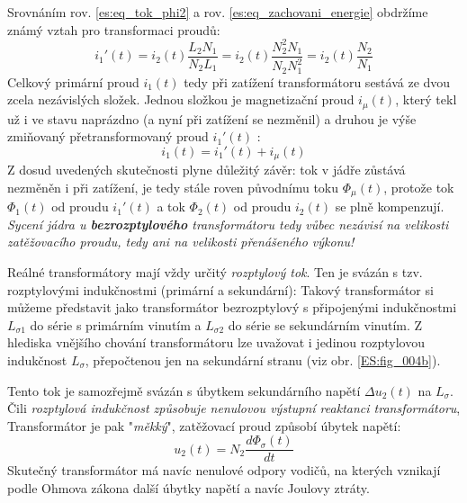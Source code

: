 {      Srovnáním rov. \ref{es:eq_tok_phi2} a rov. \ref{es:eq_zachovani_energie} obdržíme známý vztah
      pro transformaci proudů:
      \begin{equation}\label{es:eq_i1_cark}
        i_1'(t)=i_2(t)\frac{L_2N_1}{N_2L_1}=i_2 (t)\frac{N_2^2N_1}{N_2N_1^2}=i_2(t)\frac{N_2}{N_1}
      \end{equation}
      Celkový primární proud $i_1(t)$ tedy při zatížení transformátoru sestává ze dvou zcela 
      nezávislých složek. Jednou složkou je magnetizační proud $i_\mu(t)$, který tekl už i ve stavu 
      naprázdno (a nyní při zatížení se nezměnil) a druhou je výše zmiňovaný přetransformovaný 
      proud $i_1'(t)$ :
      \begin{equation}\label{es:eq_i1_sum}
        i_1(t)=i_1'(t)+i_\mu(t)
      \end{equation}
      Z dosud uvedených skutečnosti plyne důležitý závěr: tok v jádře zůstává nezměněn i při 
      zatížení, je tedy stále roven původnímu toku $\Phi_\mu(t)$, protože tok $\Phi_1(t)$ od proudu 
      $i_1'(t)$ a tok $\Phi_2(t)$ od proudu $i_2(t)$ se plně kompenzují. \emph{Sycení jádra u 
      \textbf{bezrozptylového} transformátoru tedy vůbec nezávisí na velikosti zatěžovacího 
      prou\-du, tedy ani na velikosti přenášeného výkonu!}

      Reálné transformátory mají vždy určitý \emph{rozptylový tok}. Ten je svázán s tzv.      
      roz\-pty\-lo\-vý\-mi indukčnostmi (primární a sekundární): Takový transformátor si můžeme 
      představit jako transformátor bezrozptylový s připojen\-ými indukčnostmi $L_{\sigma1}$ do 
      série s pri\-már\-ním vinutím a $L_{\sigma2}$ do série se sekundár\-ním vinutím. Z hlediska 
      vnějšího chování transformátoru lze uvažovat i jedinou rozptylovou indukčnost $L_\sigma$, 
      přepočtenou jen na sekundární stranu (viz obr. \ref{ES:fig_004b}).

      Tento tok je samozřejmě svázán s úbytkem sekundárního napětí $\Delta u_2(t)$ na $L_\sigma$.
      Čili \emph{rozptylová indukčnost způsobuje nenulovou výstupní reaktanci transformátoru},
      Transformátor je pak "\emph{měkký}", zatěžovací proud způsobí úbytek napětí:
      \begin{equation}\label{es:eq_ubytek_Lsigma}
        u_2(t)=N_2\frac{d\Phi_\sigma(t)}{dt}
      \end{equation}
      Skutečný transformátor má navíc nenulové odpory vodičů, na kterých vznikají podle Ohmova
      zákona další úbytky napětí a navíc Joulovy ztráty.

}
